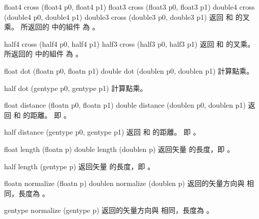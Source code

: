float4 cross (float4 p0, float4 p1)
float3 cross (float3 p0, float3 p1)
double4 cross (double4 p0, double4 p1)
double3 cross (double3 p0, double3 p1)
\stopbuffer
{}
返回  和  的叉乘。
所返回的  中的組件  為 。
\stopbuffer

half4 cross (half4 p0, half4 p1)
half3 cross (half3 p0, half3 p1)
\stopbuffer
{}
返回  和  的叉乘。
所返回的  中的組件  為 。
\stopbuffer

float dot (floatn p0, floatn p1)
double dot (doublen p0, doublen p1)
\stopbuffer
{}
計算點乘。
\stopbuffer

half dot (gentype p0, gentype p1)
\stopbuffer
{}
計算點乘。
\stopbuffer

float distance (floatn p0,
		floatn p1)
double distance (doublen p0,
		doublen p1)
\stopbuffer
{}
返回  和  的距離。
即 。
\stopbuffer

half distance (gentype p0,
		gentype p1)
\stopbuffer
{}
返回  和  的距離。
即 。
\stopbuffer

float length (floatn p)
double length (doublen p)
\stopbuffer
{}
返回矢量  的長度，即 。
\stopbuffer

half length (gentype p)
\stopbuffer
{}
返回矢量  的長度，即 。
\stopbuffer

floatn normalize (floatn p)
doublen normalize (doublen p)
\stopbuffer
{}
返回的矢量方向與  相同，長度為 。
\stopbuffer

gentype normalize (gentype p)
\stopbuffer
{}
返回的矢量方向與  相同，長度為 。
\stopbuffer

